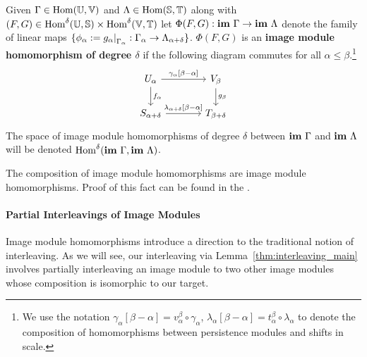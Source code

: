 \begin{definition}
  Given $\Gamma\in\mathrm{Hom}(\mathbb{U},\mathbb{V})$ and $\Lambda\in\mathrm{Hom}(\mathbb{S},\mathbb{T})$ along with $(F,G)\in\mathrm{Hom}^\delta(\mathbb{U},\mathbb{S})\times\mathrm{Hom}^\delta(\mathbb{V},\mathbb{T})$ let $\Phi(F, G) : \mathbf{im}~\Gamma\to\mathbf{im}~\Lambda$ denote the family of linear maps $\{\phi_\alpha := g_\alpha\mathord{\mid}_{\Gamma_\alpha} : \Gamma_\alpha\to\Lambda_{\alpha+\delta}\}$.
  $\Phi(F, G)$ is an \textbf{image module homomorphism of degree $\delta$} if the following diagram commutes for all $\alpha\leq\beta$.\footnote{We use the notation $\gamma_\alpha[\beta-\alpha] = v_\alpha^\beta\circ\gamma_\alpha$, $\lambda_\alpha[\beta-\alpha] = t_\alpha^\beta\circ\lambda_\alpha$ to denote the composition of homomorphisms between persistence modules and shifts in scale.}
  \begin{equation}\label{dgm:image_homomorphism}
    \begin{tikzcd}[column sep=large]
        U_\alpha\arrow{r}{\gamma_\alpha[\beta-\alpha]}\arrow{d}{f_\alpha} &
      V_\beta\arrow{d}{g_\beta}\\
      S_{\alpha+\delta}\arrow{r}{\lambda_{\alpha+\delta}[\beta-\alpha]} &
      T_{\beta +\delta}
  \end{tikzcd}\end{equation}
  The space of image module homomorphisms of degree $\delta$ between $\mathbf{im}~\Gamma$ and $\mathbf{im}~\Lambda$ will be denoted $\mathrm{Hom}^\delta(\mathbf{im}~\Gamma,\mathbf{im}~\Lambda)$.
\end{definition}
%
%
%
The composition of image module homomorphisms are image module homomorphisms.
Proof of this fact can be found in the \fullversion.

\paragraph*{Partial Interleavings of Image Modules}

Image module homomorphisms introduce a direction to the traditional notion of interleaving.
As we will see, our interleaving via Lemma~\ref{thm:interleaving_main} involves partially interleaving an image module to two other image modules whose composition is isomorphic to our target.


